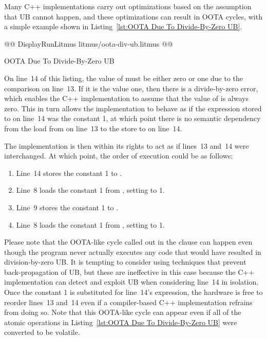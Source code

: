\documentclass[10]{article}
\begin{document}
Many C++ implementations carry out optimizations based on the assumption
that UB cannot happen, and these optimizations can result in OOTA cycles,
with a simple example shown in
Listing~\ref{lst:OOTA Due To Divide-By-Zero UB}.

\begin{listing}[tbp]
@@ DisplayRunLitmus litmus/oota-div-ub.litmus @@
\caption{OOTA Due To Divide-By-Zero UB}
\label{lst:OOTA Due To Divide-By-Zero UB}
\end{listing}

On line~14 of this listing, the value of  must be either zero
or one due to the comparison on line~13.
If it is the value one, then there is a divide-by-zero error, which
enables the C++ implementation to assume that the value of  is
always zero.
This in turn allows the implementation to behave as if the expression
stored to  on line~14 was the constant 1, at which point there
is no semantic dependency from the load from  on line~13 to the
store to  on line~14.

The implementation is then within its rights to act as if lines~13 and~14
were interchanged.
At which point, the order of execution could be as follows:

\begin{enumerate}
\item	Line~14 stores the constant 1 to .
\item	Line~8 loads the constant 1 from , setting  to 1.
\item	Line~9 stores the constant 1 to .
\item	Line~8 loads the constant 1 from , setting  to 1.
\end{enumerate}

Please note that the OOTA-like cycle called out in the 
clause can happen even though the program never actually executes any
code that would have resulted in division-by-zero UB.
It is tempting to consider using techniques
that prevent back-propagation of UB, but these are ineffective in this
case because the C++ implementation can detect and exploit UB when
considering line~14 in isolation.
Once the constant 1 is substituted for line~14's expression, the
hardware is free to reorder lines~13 and~14 even if a compiler-based
C++ implementation refrains from doing so.
Note that this OOTA-like cycle can appear even if all of the atomic
operations in
Listing~\ref{lst:OOTA Due To Divide-By-Zero UB}
were converted to be volatile.
\end{document}

